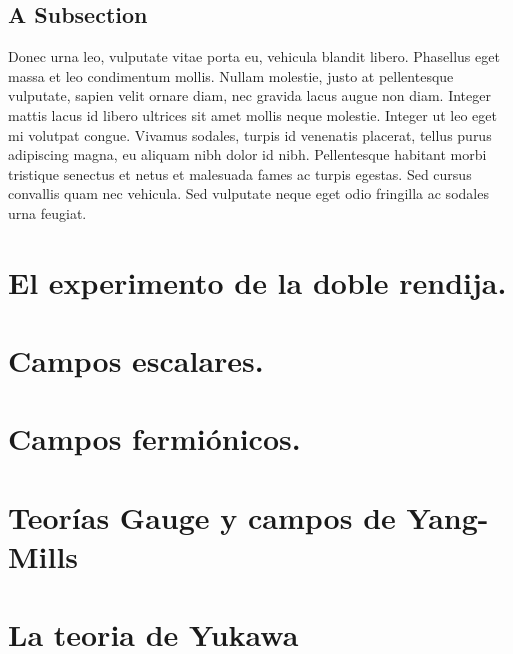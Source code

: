 \subsection{A Subsection}

Donec urna leo, vulputate vitae porta eu, vehicula blandit libero. Phasellus eget massa et leo condimentum mollis. Nullam molestie, justo at pellentesque vulputate, sapien velit ornare diam, nec gravida lacus augue non diam. Integer mattis lacus id libero ultrices sit amet mollis neque molestie. Integer ut leo eget mi volutpat congue. Vivamus sodales, turpis id venenatis placerat, tellus purus adipiscing magna, eu aliquam nibh dolor id nibh. Pellentesque habitant morbi tristique senectus et netus et malesuada fames ac turpis egestas. Sed cursus convallis quam nec vehicula. Sed vulputate neque eget odio fringilla ac sodales urna feugiat.

\section{El experimento de la doble rendija.}

\section{Campos escalares.}
\section{Campos fermiónicos.}
\section{Teorías Gauge y campos de Yang-Mills}
\section{La teoria de Yukawa}